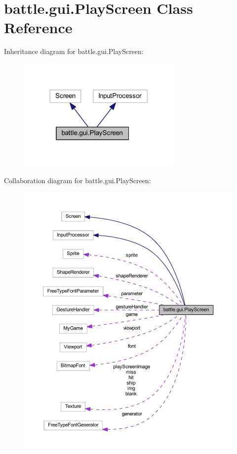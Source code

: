 \hypertarget{classbattle_1_1gui_1_1_play_screen}{}\section{battle.\+gui.\+Play\+Screen Class Reference}
\label{classbattle_1_1gui_1_1_play_screen}


Inheritance diagram for battle.\+gui.\+Play\+Screen\+:
\nopagebreak
\begin{figure}[H]
\begin{center}
\leavevmode
\includegraphics[width=228pt]{classbattle_1_1gui_1_1_play_screen__inherit__graph}
\end{center}
\end{figure}


Collaboration diagram for battle.\+gui.\+Play\+Screen\+:
\nopagebreak
\begin{figure}[H]
\begin{center}
\leavevmode
\includegraphics[width=350pt]{classbattle_1_1gui_1_1_play_screen__coll__graph}
\end{center}
\end{figure}
